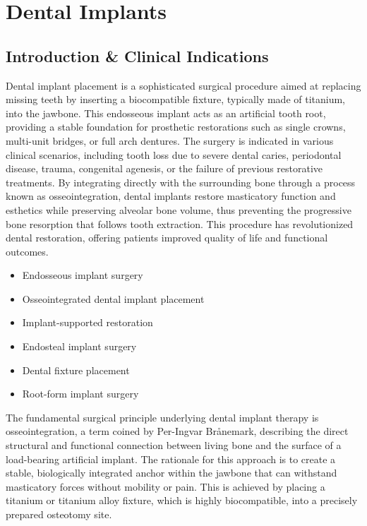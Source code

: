 \chapter{Dental Implants}

\section*{Introduction \& Clinical Indications}
Dental implant placement is a sophisticated surgical procedure aimed at replacing missing teeth by inserting a biocompatible fixture, typically made of titanium, into the jawbone. This endosseous implant acts as an artificial tooth root, providing a stable foundation for prosthetic restorations such as single crowns, multi-unit bridges, or full arch dentures. The surgery is indicated in various clinical scenarios, including tooth loss due to severe dental caries, periodontal disease, trauma, congenital agenesis, or the failure of previous restorative treatments. By integrating directly with the surrounding bone through a process known as osseointegration, dental implants restore masticatory function and esthetics while preserving alveolar bone volume, thus preventing the progressive bone resorption that follows tooth extraction. This procedure has revolutionized dental restoration, offering patients improved quality of life and functional outcomes.

\begin{itemize}
  \item Endosseous implant surgery
  \item Osseointegrated dental implant placement
  \item Implant-supported restoration
  \item Endosteal implant surgery
  \item Dental fixture placement
  \item Root-form implant surgery
\end{itemize}

The fundamental surgical principle underlying dental implant therapy is osseointegration, a term coined by Per-Ingvar Br\aa{}nemark, describing the direct structural and functional connection between living bone and the surface of a load-bearing artificial implant. The rationale for this approach is to create a stable, biologically integrated anchor within the jawbone that can withstand masticatory forces without mobility or pain. This is achieved by placing a titanium or titanium alloy fixture, which is highly biocompatible, into a precisely prepared osteotomy site. 

